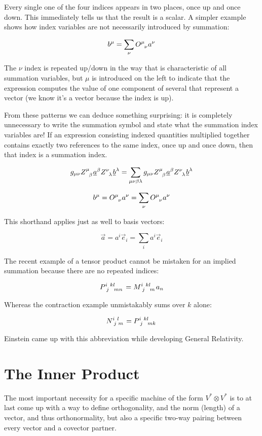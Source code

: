 Every single one of the four indices appears in two places, once up and once down. This immediately tells us that the result is a scalar. A simpler example shows how index variables are not necessarily introduced by summation:

$$
b^\mu = \sum_{\nu} O\indices{^\mu_\nu} a^\nu
$$

The $\nu$ index is repeated up/down in the way that is characteristic of all summation variables, but $\mu$ is introduced on the left to indicate that the expression computes the value of one component of several that represent a vector (we know it's a vector because the index is up).

From these patterns we can deduce something surprising: it is completely unnecessary to write the summation symbol and state what the summation index variables are! If an expression consisting indexed quantities multiplied together contains exactly two references to the same index, once up and once down, then that index is a summation index.

$$
g_{\mu\nu} Z\indices{^\mu_\beta} \underline{a}^{\beta} Z\indices{^\nu_\lambda} \underline{b}^{\lambda}
=
\sum_{\mu\nu\beta\lambda} g_{\mu\nu} Z\indices{^\mu_\beta} \underline{a}^{\beta} Z\indices{^\nu_\lambda} \underline{b}^{\lambda}
$$

$$
b^\mu = O\indices{^\mu_\nu} a^\nu = \sum_{\nu} O\indices{^\mu_\nu} a^\nu
$$

This shorthand applies just as well to basis vectors:

$$
\vec{a} = a^i \vec{e}_i = \sum_{i} a^i \vec{e}_i
$$

The recent example of a tensor product cannot be mistaken for an implied summation because there are no repeated indices:

$$
P\indices{^i_j^k^l_m_n} = M\indices{^i_j^k^l_m} a_n
$$
 
Whereas the contraction example unmistakably sums over $k$ alone:

$$
N\indices{^i_j^l_m} = P\indices{^i_j^k^l_m_k}
$$

Einstein came up with this abbreviation while developing General Relativity.

\section{The Inner Product}

The most important necessity for a specific machine of the form $V^* \otimes V^*$ is to at last come up with a way to define orthogonality, and the norm (length) of a vector, and thus orthonormality, but also a specific two-way pairing between every vector and a covector partner.

